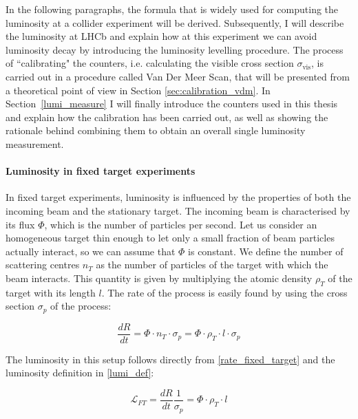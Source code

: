 In the following paragraphs, the formula that is widely used for computing the luminosity at a collider experiment will be derived.
Subsequently, I will describe the luminosity at LHCb and explain how at this experiment we can avoid luminosity decay by introducing the luminosity levelling procedure. The process of ``calibrating" the counters, i.e. calculating the visible cross section $\sigma_{\text{vis}}$, is carried out in a procedure called Van Der Meer Scan, that will be presented from a theoretical point of view in Section \ref{sec:calibration_vdm}. In Section~\ref{lumi_measure} I will finally introduce the counters used in this thesis and explain how the calibration has been carried out, as well as showing the rationale behind combining them to obtain an overall single luminosity measurement.

\paragraph{Luminosity in fixed target experiments}
In fixed target experiments, luminosity is influenced by the properties of both the incoming beam and the stationary target. The incoming beam is characterised by its flux $\Phi$, which is the number of particles per second. Let us consider an homogeneous target thin enough to let only a small fraction of beam particles actually
interact, so we can assume that $\Phi$ is constant. We define the number of scattering centres $n_T$ as the number of particles of the target with which the beam interacts. This quantity is given by multiplying the atomic density $\rho_T$ of the target with its length $l$.  
The rate of the process is easily found by using the cross section $\sigma_p$ of the process:

\begin{equation}
\frac{dR}{dt} =\Phi \cdot n_T \cdot \sigma_p = \Phi \cdot \rho_T \cdot l \cdot \sigma_p\label{rate_fixed_target}
\end{equation}

The luminosity in this setup follows directly from \eqref{rate_fixed_target} and the luminosity definition in \eqref{lumi_def}:

\begin{equation}
\mathcal{L}_{FT} = \frac{dR}{dt}\frac{1}{\sigma_p} = \Phi \cdot \rho_T \cdot l
\end{equation}

